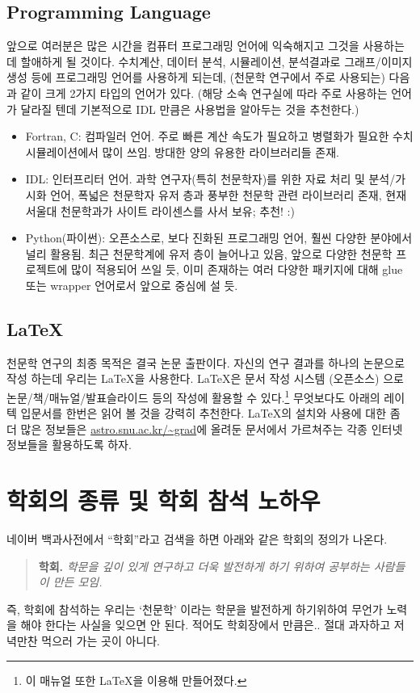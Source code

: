 \subsection{Programming Language}
앞으로 여러분은 많은 시간을 컴퓨터 프로그래밍 언어에 익숙해지고 그것을 사용하는데
할애하게 될 것이다. 수치계산, 데이터 분석, 시뮬레이션, 분석결과로 그래프/이미지
생성 등에 프로그래밍 언어를 사용하게 되는데, (천문학 연구에서 주로 사용되는)
다음과 같이 크게 2가지 타입의 언어가 있다. (해당 소속 연구실에 따라 주로 사용하는
언어가 달라질 텐데 기본적으로 IDL 만큼은 사용법을 알아두는 것을 추천한다.)

\begin{itemize}
\item Fortran, C: 컴파일러 언어. 주로 빠른 계산 속도가 필요하고 병렬화가 필요한
  수치 시뮬레이션에서 많이 쓰임. 방대한 양의 유용한 라이브러리들 존재.
\item IDL: 인터프리터 언어. 과학 연구자(특히 천문학자)를 위한 자료 처리 및
  분석/가시화 언어, 폭넓은 천문학자 유저 층과 풍부한 천문학 관련 라이브러리
  존재, 현재 서울대 천문학과가 사이트 라이센스를 사서 보유; 추천! :)
\item Python(파이썬): 오픈소스로, 보다 진화된 프로그래밍 언어, 훨씬 다양한
  분야에서 널리 활용됨. 최근 천문학계에 유저 층이 늘어나고 있음, 앞으로 다양한
  천문학 프로젝트에 많이 적용되어 쓰일 듯, 이미 존재하는 여러 다양한 패키지에
  대해 glue 또는 wrapper 언어로서 앞으로 중심에 설 듯.
\end{itemize}

\subsection{LaTeX}
천문학 연구의 최종 목적은 결국 논문 출판이다. 자신의 연구 결과를 하나의 논문으로
작성 하는데 우리는 LaTeX을 사용한다. LaTeX은 문서 작성 시스템 (오픈소스) 으로
논문/책/매뉴얼/발표슬라이드 등의 작성에 활용할 수 있다.\footnote{이 매뉴얼 또한
  LaTeX을 이용해 만들어졌다.} 무엇보다도 아래의 레이텍 입문서를 한번은 읽어 볼
것을 강력히 추천한다. LaTeX의 설치와 사용에 대한 좀 더 많은 정보들은
\url{astro.snu.ac.kr/~grad}에 올려둔 문서에서 가르쳐주는 각종 인터넷 정보들을
활용하도록 하자.

\section{학회의 종류 및 학회 참석 노하우}
네이버 백과사전에서 “학회”라고 검색을 하면 아래와 같은 학회의 정의가 나온다.

\begin{quote}
\textbf{학회.} \textit{학문을 깊이 있게 연구하고 더욱 발전하게 하기 위하여 공부하는 사람들이 만든 모임.}
\end{quote}
즉, 학회에 참석하는 우리는 ‘천문학’ 이라는 학문을 발전하게 하기위하여 무언가
노력을 해야 한다는 사실을 잊으면 안 된다. 적어도 학회장에서 만큼은.. 절대
과자하고 저녁만찬 먹으러 가는 곳이 아니다.

